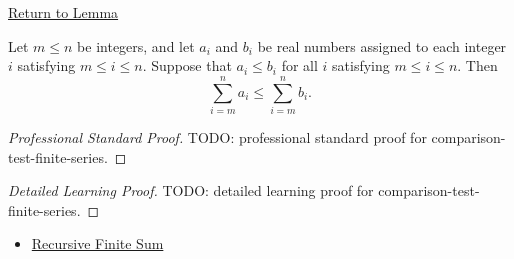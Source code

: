 \newpage
{}
\label{prf:comparison-test-finite-series}

\begin{remark*}[Return]
\hyperref[lem:comparison-test-finite-series]{Return to Lemma}
\end{remark*}

\begin{lemma*}
Let \(m \le n\) be integers, and let \(a_i\) and \(b_i\) be real
numbers assigned to each integer \(i\) satisfying \(m \le i \le n\).
Suppose that \(a_i \le b_i\) for all \(i\) satisfying \(m \le i \le n\).
Then
\[
  \sum_{i=m}^{n} a_i
  \le
  \sum_{i=m}^{n} b_i.
\]
\end{lemma*}

\begin{proof}[Professional Standard Proof]
\LRAProofBodyStart
TODO: professional standard proof for comparison-test-finite-series.
\end{proof}

\begin{proof}[Detailed Learning Proof]
\LRAProofBodyStart
TODO: detailed learning proof for comparison-test-finite-series.
\end{proof}

\begin{remark*}
\end{remark*}

\begin{dependencies}
\begin{itemize}
  \item \hyperref[def:recursive-finite-sum]{Recursive Finite Sum}
\end{itemize}
\end{dependencies}

\clearpage
